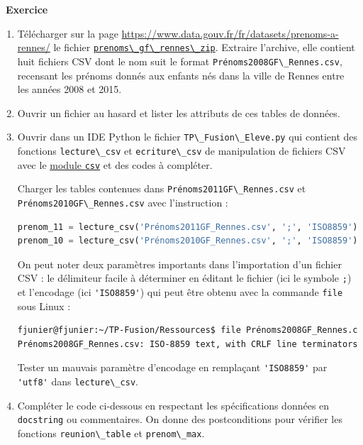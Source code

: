 \documentclass[
  11pt,
]{article}
\newcommand{\passthrough}[1]{#1}
\newcounter{exo}
\newenvironment{exercice}[1]
{\par \medskip   \addtocounter{exo}{1} \noindent  
\begin{bclogo}[arrondi =0.1,   noborder = true, logo=\bccrayon, marge=4]{~\textbf{Exercice} \textbf{\theexo} {\itshape #1} }  \par}
{
\end{bclogo}
 \par \bigskip }
\newcounter{def}
\begin{document}
\begin{exercice}{}

\begin{enumerate}
\def\labelenumi{\arabic{enumi}.}
\item
  Télécharger sur la page
  \url{https://www.data.gouv.fr/fr/datasets/prenoms-a-rennes/} le
  fichier
  \href{https://www.data.gouv.fr/fr/datasets/r/4b1b72d6-7238-4bda-a5de-ebd72cb058a0}{\passthrough{\lstinline!prenoms\_gf\_rennes\_zip!}}.
  Extraire l'archive, elle contient huit fichiers CSV dont le nom suit
  le format \passthrough{\lstinline!Prénoms2008GF\_Rennes.csv!},
  recensant les prénoms donnés aux enfants nés dans la ville de Rennes
  entre les années 2008 et 2015.
\item
  Ouvrir un fichier au hasard et lister les attributs de ces tables de
  données.
\item
  Ouvrir dans un IDE Python le fichier
  \passthrough{\lstinline!TP\_Fusion\_Eleve.py!} qui contient des
  fonctions \passthrough{\lstinline!lecture\_csv!} et
  \passthrough{\lstinline!ecriture\_csv!} de manipulation de fichiers
  CSV avec le
  \href{https://docs.python.org/fr/3/library/csv.html}{module
  \passthrough{\lstinline!csv!}} et des codes à compléter.

  Charger les tables contenues dans
  \passthrough{\lstinline!Prénoms2011GF\_Rennes.csv!} et
  \passthrough{\lstinline!Prénoms2010GF\_Rennes.csv!} avec l'instruction
  :

\begin{lstlisting}[language=Python]
prenom_11 = lecture_csv('Prénoms2011GF_Rennes.csv', ';', 'ISO8859')
prenom_10 = lecture_csv('Prénoms2010GF_Rennes.csv', ';', 'ISO8859')
\end{lstlisting}

  On peut noter deux paramètres importants dans l'importation d'un
  fichier CSV : le délimiteur facile à déterminer en éditant le fichier
  (ici le symbole \passthrough{\lstinline!;!}) et l'encodage (ici
  \passthrough{\lstinline!'ISO8859'!}) qui peut être obtenu avec la
  commande \passthrough{\lstinline!file!} sous Linux :

\begin{lstlisting}[language=bash]
fjunier@fjunier:~/TP-Fusion/Ressources$ file Prénoms2008GF_Rennes.csv 
Prénoms2008GF_Rennes.csv: ISO-8859 text, with CRLF line terminators
\end{lstlisting}

  Tester un mauvais paramètre d'encodage en remplaçant
  \passthrough{\lstinline!'ISO8859'!} par
  \passthrough{\lstinline!'utf8'!} dans
  \passthrough{\lstinline!lecture\_csv!}.
\item
  Compléter le code ci-dessous en respectant les spécifications données
  en \passthrough{\lstinline!docstring!} ou commentaires. On donne des
  postconditions pour vérifier les fonctions
  \passthrough{\lstinline!reunion\_table!} et
  \passthrough{\lstinline!prenom\_max!}.
\end{enumerate}


\end{exercice}
\end{document}
